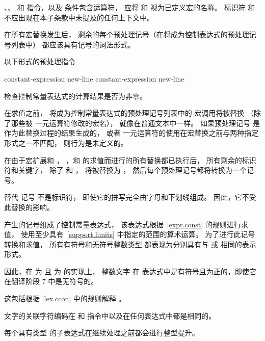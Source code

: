     \pnum
    、、 和 
    指令，以及
     条件包含运算符，
    应将  和 
    视为已定义宏的名称。
    标识符  和 
    不应出现在本子条款中未提及的任何上下文中。
    
    \pnum
    在所有宏替换发生后，
    剩余的每个预处理记号（在将成为控制表达式的预处理记号列表中）
    都应该具有记号的词法形式。
    
    \pnum
    以下形式的预处理指令
    \begin{ncsimplebnf}\obeyspaces
     constant-expression new-line \br
     constant-expression new-line 
    \end{ncsimplebnf}
    检查控制常量表达式的计算结果是否为非零。
    
    \pnum
    在求值之前，
    将成为控制常量表达式的预处理记号列表中的
    宏调用将被替换
    （除了那些被
    一元运算符修改的宏名），
    就像在普通文本中一样。
    如果预处理记号
    是作为此替换过程的结果生成的，
    或者
    一元运算符的使用在宏替换之前与两种指定形式之一不匹配，
    则行为是未定义的。
    
    \pnum
    在由于宏扩展和
    ，
    ，和
    的求值而进行的所有替换都已执行后，
    所有剩余的标识符和关键字，
    除了
    和
    ，
    将被替换为 
    ，
    然后每个预处理记号都将转换为一个记号。
    \begin{note}
    替代
    记号 不是标识符，
    即使它的拼写完全由字母和下划线组成。
    因此，它不受此替换的影响。
    \end{note}
    
    \pnum
    产生的记号组成了控制常量表达式，
    该表达式根据~\ref{expr.const} 的规则进行求值，
    使用至少具有~\ref{support.limits} 中指定的范围的算术运算。
    为了进行此记号转换和求值，
    所有有符号和无符号整数类型
    都表现为分别具有与
     或  相同的表示形式。
    \begin{note}
    因此，在
     为 
    且  为  的实现上，
    整数文字  在 
    表达式中是有符号且为正的，即使它在翻译阶段
    7 中是无符号的。
    \end{note}
    这包括根据 \ref{lex.ccon} 中的规则解释 。
    \begin{note}
    文字的关联字符编码在  和  指令中以及在任何表达式中都是相同的。
    \end{note}
    每个具有类型
    的子表达式在继续处理之前都会进行整型提升。
    
